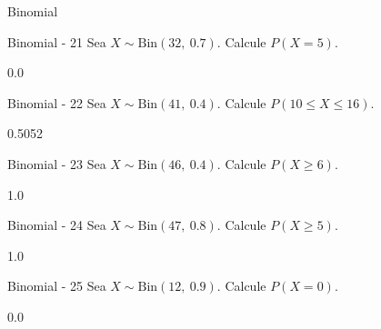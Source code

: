 \documentclass[a4,11pt]{aleph-notas}
\newcommand{\Bin}{\text{Bin}}
\begin{document}
\begin{quiz}{Binomial}
\begin{numerical}[tolerance=0.001]%
    {Binomial - 21}
    Sea \( X \sim \Bin(32,\ 0.7) \). Calcule \( P(X = 5) \).
    \item[] 0.0
\end{numerical}

\begin{numerical}[tolerance=0.001]%
    {Binomial - 22}
    Sea \( X \sim \Bin(41,\ 0.4) \). Calcule \( P(10 \leq X \leq 16) \).
    \item[] 0.5052
\end{numerical}

\begin{numerical}[tolerance=0.001]%
    {Binomial - 23}
    Sea \( X \sim \Bin(46,\ 0.4) \). Calcule \( P(X \geq 6) \).
    \item[] 1.0
\end{numerical}

\begin{numerical}[tolerance=0.001]%
    {Binomial - 24}
    Sea \( X \sim \Bin(47,\ 0.8) \). Calcule \( P(X \geq 5) \).
    \item[] 1.0
\end{numerical}

\begin{numerical}[tolerance=0.001]%
    {Binomial - 25}
    Sea \( X \sim \Bin(12,\ 0.9) \). Calcule \( P(X = 0) \).
    \item[] 0.0
\end{numerical}




\end{quiz}
\end{document}
